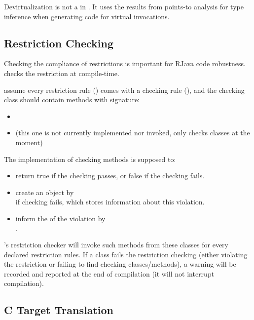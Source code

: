 \documentclass[12pt]{article}
\begin{document}
Devirtualization is not a  in \rjc. It uses the results
from points-to analysis for type inference when generating code for virtual invocations. 

\subsection{Restriction Checking}

Checking the compliance of restrictions is important for RJava code robustness. 
\rjc checks the restriction at compile-time. 

\rjc assume every restriction rule ()
comes with a checking rule (),
and the checking class should contain methods with signature:
\begin{itemize}
\item {}
\item {} 
(this one is not currently implemented nor invoked, \rjc only checks classes at the moment)
\end{itemize}

The implementation of checking methods is supposed to:
\begin{itemize}
\item return true if the checking passes, or false if the checking fails. 
\item create an  object by \\
if checking fails, which stores information about this violation. 
\item inform the  of the violation by\\
. 
\end{itemize}

\rjc 's restriction checker will invoke such methods from these classes 
for every declared restriction rules.
If a class fails the restriction checking (either violating the restriction or 
failing to find checking classes/methods), a warning will be recorded
and reported at the end of compilation (it will not interrupt compilation). 

\subsection{C Target Translation}
\end{document}
